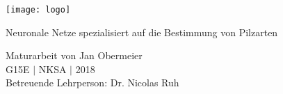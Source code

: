 \thispagestyle{empty}

\vspace{10cm}
\vspace*{3cm}

\texttt{[image: logo]}
	
\vspace{0.5cm}
\large Neuronale Netze spezialisiert auf die Bestimmung von Pilzarten\\
\vspace{8cm}

\begin{flushright}
	Maturarbeit von Jan Obermeier\\
	
	G15E $\mid$ NKSA $\mid$ 2018\\
	\vspace{0.5cm}
	Betreuende Lehrperson: Dr. Nicolas Ruh
\end{flushright}

